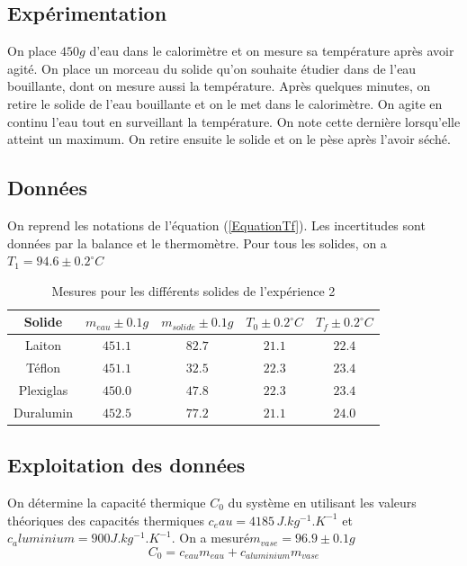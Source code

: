 \documentclass[12pt]{article}
\begin{document}
\subsection{Expérimentation}

On place $450g$ d'eau dans le calorimètre et on mesure sa température après avoir agité. On place un morceau du solide qu'on souhaite étudier dans de l'eau bouillante, dont on mesure aussi la température. 
Après quelques minutes, on retire le solide de l'eau bouillante et on le met dans le calorimètre. 
On agite en continu l'eau tout en surveillant la température. On note cette dernière lorsqu'elle atteint un maximum. 
On retire ensuite le solide et on le pèse après l'avoir séché.

\subsection{Données}
On reprend les notations de l'équation (\ref{EquationTf}). Les incertitudes sont données par la balance et le thermomètre. Pour tous les solides, on a $T_1=94.6\pm 0.2^{\circ}C$
\begin{table}[h!]
	\begin{center}
		\begin{tabular}{|c|c|c|c|c|}
		\hline
		Solide & $m_{eau} \pm 0.1g$ & $m_{solide}\pm 0.1g$ & $T_0\pm 0.2^{\circ}C$ & $T_f\pm 0.2^{\circ}C$\\ \hline
		Laiton & $451.1$ & $82.7$ & $21.1$ & $22.4$ \\
		Téflon & $451.1$ & $32.5$ & $22.3$ & $23.4$ \\
		Plexiglas & $450.0$ & $47.8$ & $22.3$ & $23.4$ \\
		Duralumin & $452.5$ & $77.2$ & $21.1$ & $24.0$ \\ \hline
		\end{tabular}
		\caption{Mesures pour les différents solides de l'expérience 2}
		\label{table:mesureexp2}
	\end{center}
\end{table}

\subsection{Exploitation des données}
On détermine la capacité thermique $C_0$ du système en utilisant les valeurs théoriques des capacités thermiques $c_eau=4185\, J.kg^{-1}.K^{-1}$ et $c_aluminium=900 J.kg^{-1}.K^{-1}$. On a mesuré$m_{vase}=96.9\pm 0.1g$
\begin{equation}
C_0=c_{eau}m_{eau}+c_{aluminium}m_{vase}
\end{equation}
\end{document}
